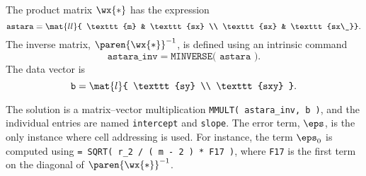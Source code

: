 The product matrix $\wx{*}$ has the expression
  \begin{equation*}   %
    \texttt{astara} = \mat{ll}{ \texttt{m} & \texttt{sx} \\ \texttt{sx} & \texttt{sx\_}}.
  \end{equation*}
The inverse matrix, $\paren{\wx{*}}^{-1}$, is defined using an intrinsic command
  \begin{equation*}   %
    \texttt{astara\_inv} = \texttt{MINVERSE( astara )}.
  \end{equation*}
The data vector is
  \begin{equation*}   %
    \texttt{b} = \mat{l}{ \texttt{sy} \\ \texttt{sxy} }.
  \end{equation*}

The solution is a matrix--vector multiplication \texttt{MMULT( astara\_inv, b )}, and the individual entries are named \texttt{intercept} and \texttt{slope}. The error term, $\eps$, is the only instance where cell addressing is used. For instance, the term $\eps_{0}$ is computed using \texttt{=  SQRT( r\_2 / ( m - 2 ) * F17 )}, where \texttt{F17} is the first term on the diagonal of $\paren{\wx{*}}^{-1}$.

\endinput